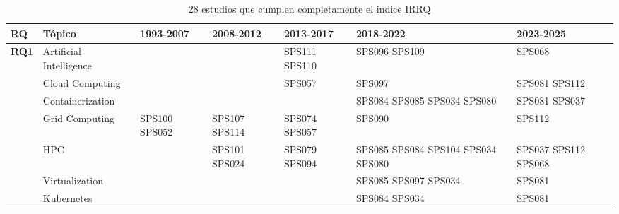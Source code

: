 \begin{table*}[htbp]
	\centering
	\caption{28 estudios que cumplen completamente el indice IRRQ}
	\label{table:highest_IRRQ}
	\renewcommand{\arraystretch}{1.2}
	\setlength{\tabcolsep}{6pt}
	\begin{tabularx}{\textwidth}{p{0.8cm}p{2.5cm}>{\raggedright\arraybackslash}X>{\raggedright\arraybackslash}X>{\raggedright\arraybackslash}X>{\raggedright\arraybackslash}X>{\raggedright\arraybackslash}X}
		\toprule
		\textbf{RQ}                          & \textbf{Tópico}         & \textbf{1993-2007} & \textbf{2008-2012}   & \textbf{2013-2017}          & \textbf{2018-2022}                               & \textbf{2023-2025}          \\
		\midrule
		\multirow{12}{*}[0em]{\textbf{RQ1}}  & Artificial Intelligence &                    &                      & SPS111 SPS110               & SPS096 SPS109                                    & SPS068                      \\
		\addlinespace[0.3em]
		                                     & Cloud Computing         &                    &                      & SPS057                      & SPS097                                           & SPS081 SPS112               \\
		\addlinespace[0.3em]
		                                     & Containerization        &                    &                      &                             & SPS084 SPS085 SPS034 SPS080                      & SPS081 SPS037               \\
		\addlinespace[0.3em]
		                                     & Grid Computing          & SPS100 SPS052      & SPS107 SPS114        & SPS074 SPS057               & SPS090                                           & SPS112                      \\
		\addlinespace[0.3em]
		                                     & HPC                     &                    & SPS101 SPS024        & SPS079 SPS094               & SPS085 SPS084 SPS104 SPS034 SPS080               & SPS037 SPS112 SPS068        \\
		\addlinespace[0.3em]
		                                     & Virtualization          &                    &                      &                             & SPS085 SPS097 SPS034                             & SPS081                      \\
		\addlinespace[0.3em]
		                                     & Kubernetes              &                    &                      &                             & SPS084 SPS034                                    & SPS081                      \\

\end{tabularx}
\end{table*}
